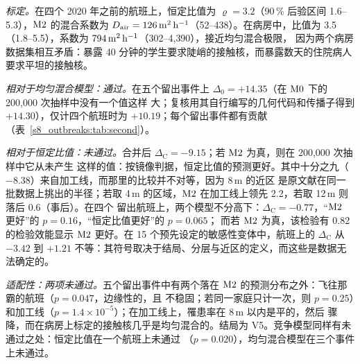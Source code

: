\emph{标定。}在四个 2020 年之前的航班上，恒定比值为 $\varrho=3.2$（90\,\% 后验区间 1.6--5.3），$\mathrm{M2}$ 的混合系数为
$D_{\mathrm{air}}=126\,\mathrm{m}^2\,\mathrm{h}^{-1}$（52--438）。在病房中，比值为 3.5（1.8--5.5），系数为 $794\,\mathrm{m}^2\,\mathrm{h}^{-1}$（302--4{,}390），接近均匀混合极限，
因为两个病房数据集相互矛盾：暴露 40 分钟的学生要求陡峭的接触核，而暴露数天的住院病人要求平坦的接触核。

\emph{相对于均匀混合模型：通过。}在五个留出事件上 $\Delta_0=+14.35$（在 $\mathrm{M0}$ 下的 200{,}000 次抽样中没有一个值这样
大；复核用其自行编写的几何代码和传播子得到 $+14.30$），仅计四个航班时为 $+10.19$；每个留出事件都有贡献
（表~\ref{s8_outbreaks:tab:second}）。

\emph{相对于恒定比值：未通过。}合并后 $\Delta_{\mathrm{C}}=-9.15$；若 $\mathrm{M2}$ 为真，则在 200{,}000 次抽样中它从未产生
这样的值：按镜像判据，恒定比值的预测更好。其中十分之九（$-8.38$）来自加工线，而那里的比较并不对等，因为 8\,m 的近区
是原文献在同一批数据上挑出的半径；若取 4\,m 的区域，$\mathrm{M2}$ 在加工线上领先 2.2，若取 12\,m 则落后 0.6（事后）。在四个
留出航班上，两个模型不分高下：$\Delta_{\mathrm{C}}=-0.77$，“$\mathrm{M2}$ 更好”的 $p=0.16$，“恒定比值更好”的 $p=0.065$；
而若 $\mathrm{M2}$ 为真，该检验有 0.82 的检验效能显示 $\mathrm{M2}$ 更好。在 15 个预先设定的敏感性变体中，航班上的
$\Delta_{\mathrm{C}}$ 从 $-3.42$ 到 $+1.21$ 不等：其符号取决于结局、分层与近区的定义，而这些是数据无法确定的。

\emph{适配性：两项未通过。}五个留出事件中有两个落在 $\mathrm{M2}$ 的预测分布之外：飞往那霸的航班（$p=0.047$，边缘性的，且
不稳固；若同一家庭只计一次，则 $p=0.25$）和加工线（$p=1.4\times10^{-5}$）；在加工线上，罹患率在 8\,m 以内是平的，然后
骤降，而在病房上标定的接触核几乎是均匀混合的。结局为 V5。竞争模型同样有未通过之处：恒定比值在一个航班上未通过
（$p=0.020$），均匀混合模型在三个事件上未通过。

